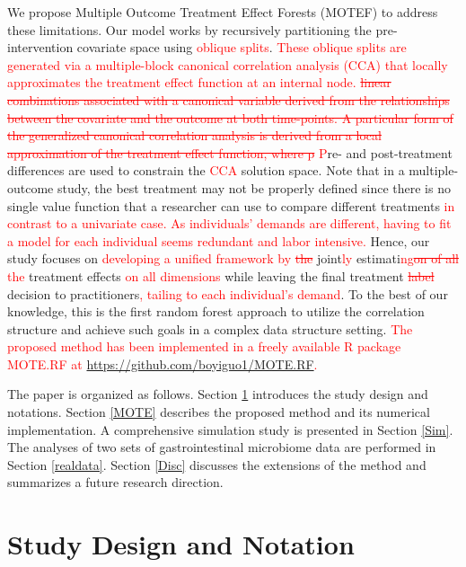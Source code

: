 \documentclass[smallextended]{svjour3}
\newcommand{\bg}[1]{\textcolor{red}{#1}}
\begin{document}
We propose Multiple Outcome Treatment Effect Forests (MOTEF) to address these limitations. Our model works by recursively partitioning the pre-intervention covariate space using \bg{oblique splits}. \bg{These oblique splits are generated via a multiple-block canonical correlation analysis (CCA) that locally approximates the treatment effect function at an internal node. \st{linear combinations associated with a canonical variable derived from the relationships between the covariate and the outcome at both time-points. A particular form of the generalized canonical correlation analysis is derived from a local approximation of the treatment effect function, where p} P}re- and post-treatment differences are used to constrain the \bg{CCA} solution space. Note that in a multiple-outcome study, the best treatment may not be properly defined since there is no single value function \citep{qian2011performance} that a researcher can use to compare different treatments \bg{ in contrast to a univariate case.} \bg{As individuals' demands are different, having to fit a model for each individual seems redundant and labor intensive.} Hence, our study focuses on \bg{developing a unified framework by \st{the }}joint\bg{ly} estimati\bg{ng\st{on of all}} \bg{the }treatment effects \bg{on all dimensions} while leaving the final treatment \bg{\st{label}} decision to practitioners\bg{, tailing to each individual's demand}. To the best of our knowledge, this is the first random forest approach to utilize the correlation structure and achieve such goals in a complex data structure setting. \bg{The proposed method has been implemented in a freely available R package MOTE.RF at \url{https://github.com/boyiguo1/MOTE.RF}.}

The paper is organized as follows. Section \ref{Notation} introduces the study design and notations. Section \ref{MOTE} describes the proposed method and its numerical implementation. A comprehensive simulation study is presented in Section \ref{Sim}. The analyses of two sets of gastrointestinal microbiome data are performed in Section \ref{realdata}. Section \ref{Disc} discusses the extensions of the method and summarizes a future research direction.

\section{Study Design and Notation}\label{Notation}
\end{document}
